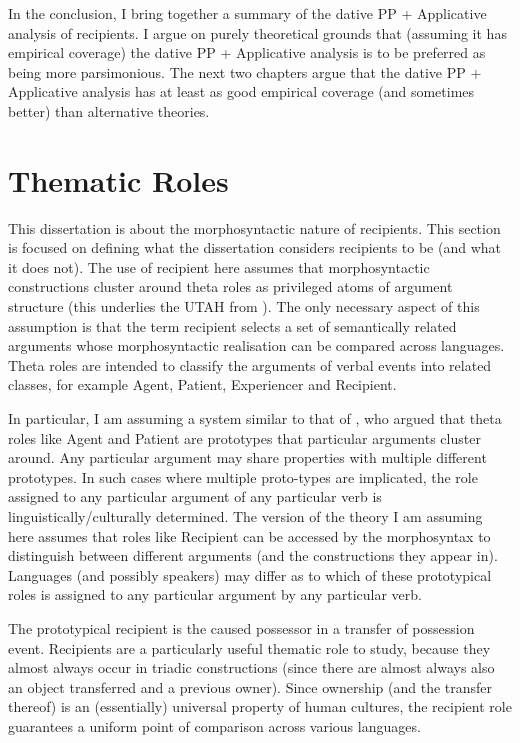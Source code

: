 In the conclusion, I bring together a summary of the dative PP + Applicative analysis of recipients. I argue on purely theoretical grounds that (assuming it has empirical coverage) the dative PP + Applicative analysis is to be preferred as being more parsimonious. The next two chapters argue that the dative PP + Applicative analysis has at least as good empirical coverage (and sometimes better) than alternative theories.

\section{Thematic Roles}
This dissertation is about the morphosyntactic nature of recipients. This section is focused on defining what the dissertation considers recipients to be (and what it does not). The use of recipient here assumes that morphosyntactic constructions cluster around theta roles as privileged atoms of argument structure (this underlies the UTAH from \citealt{Baker.1988}). The only necessary aspect of this assumption is that the term recipient selects a set of semantically related arguments whose morphosyntactic realisation can be compared across languages. Theta roles are intended to classify the arguments of verbal events into related classes, for example Agent, Patient, Experiencer and Recipient. 

In particular, I am assuming a system similar to that of \cite{Dowty.1991}, who argued that theta roles like Agent and Patient are prototypes that particular arguments cluster around. Any particular argument may share properties with multiple different prototypes. In such cases where multiple proto-types are implicated, the role assigned to any particular argument of any particular verb is linguistically/culturally determined. The version of the theory I am assuming here assumes that roles like Recipient can be accessed by the morphosyntax to distinguish between different arguments (and the constructions they appear in). Languages (and possibly speakers) may differ as to which of these prototypical roles is assigned to any particular argument by any particular verb.

The prototypical recipient is the caused possessor in a transfer of possession event. Recipients are a particularly useful thematic role to study, because they almost always occur in triadic constructions (since there are almost always also an object transferred and a previous owner). Since ownership (and the transfer thereof) is an (essentially) universal property of human cultures, the recipient role guarantees a uniform point of comparison across various languages. 

